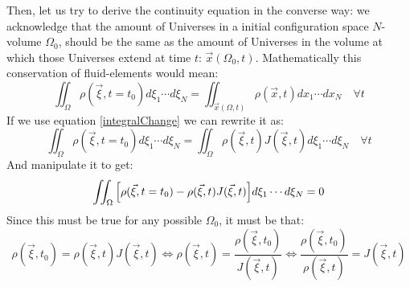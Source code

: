 \documentclass[11pt, a4paper]{article} %
\begin{document}
Then, let us try to derive the continuity equation in the converse way: we acknowledge that the amount of Universes in a initial configuration space $N$-volume $\Omega_0$, should be the same as the amount of Universes in the volume at which those Universes extend at time $t$: $\vec{x}(\Omega_0,t)$. Mathematically this conservation of fluid-elements would mean:
\begin{equation}
\iint_\Omega \rho(\vec{\xi},t=t_0) d\xi_1\cdots d\xi_N=\iint_{\vec{x}(\Omega,t)} \rho(\vec{x},t) dx_1\cdots dx_N\quad \forall t
\end{equation}
If we use equation \eqref{integralChange} we can rewrite it as:
\begin{equation}
\iint_\Omega \rho(\vec{\xi},t=t_0) d\xi_1\cdots d\xi_N=\iint_{\Omega} \rho(\vec{\xi},t) J(\vec{\xi},t) d\xi_1\cdots d\xi_N \quad \forall t
\end{equation}
And manipulate it to get:
\begin{equation}
\iint_\Omega \qty[ \rho(\vec{\xi},t=t_0) -\rho(\vec{\xi},t) J(\vec{\xi},t) ]d\xi_1\cdots d\xi_N=0
\end{equation}
Since this must be true for any possible $\Omega_0$, it must be that:
\begin{equation}
\rho(\vec{\xi},t_0) = \rho(\vec{\xi},t) J(\vec{\xi},t)\Longleftrightarrow \rho(\vec{\xi},t)=\frac{\rho(\vec{\xi},t_0)}{J(\vec{\xi},t)}\Longleftrightarrow \frac{\rho(\vec{\xi},t_0)}{\rho(\vec{\xi},t)}=J(\vec{\xi},t)
\end{equation}
\end{document}
